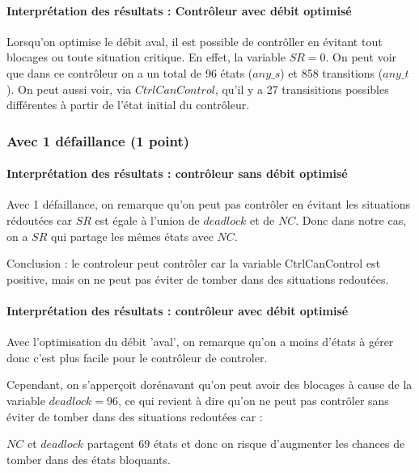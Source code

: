\documentclass[a4paper]{book}
\begin{document}
\paragraph{Interprétation des résultats : Contrôleur avec débit optimisé}

Lorsqu'on optimise le débit aval, il est possible de contrôller en évitant tout blocages ou toute situation critique. En effet, la variable $SR = 0$.
On peut voir que dans ce contrôleur on a un total de 96 états ($any\_s$) et 858 transitions ($any\_t$). On peut aussi voir, via $CtrlCanControl$, qu'il y a 27 transisitions possibles différentes à partir de l'état initial du contrôleur.

\subsubsection{Avec 1 défaillance (1 point)}


%
%
%
\paragraph{Interprétation des résultats : contrôleur sans débit optimisé}
Avec 1 défaillance, on remarque qu'on peut pas contrôler en évitant les situations rédoutées car $SR$ est égale à l'union de $deadlock$ et de $NC$.
Donc dans notre cas, on a $SR$ qui partage les mêmes états avec $NC$.

Conclusion : le controleur peut contrôler car la variable CtrlCanControl est positive, mais on ne peut pas éviter de tomber dans des situations redoutées.

\paragraph{Interprétation des résultats : contrôleur avec débit optimisé}
Avec l'optimisation du débit 'aval', on remarque qu'on a moins d'états à gérer donc c'est plus facile pour le contrôleur de controler.

Cependant, on s'apperçoit dorénavant qu'on peut avoir des blocages à cause de la variable $deadlock = 96$, ce qui revient à dire qu'on ne peut pas contrôler sans éviter de tomber dans des situations redoutées car :

$NC$ et $deadlock$ partagent $69$ états et donc on risque d'augmenter les chances de tomber dans des états bloquants.
\end{document}
